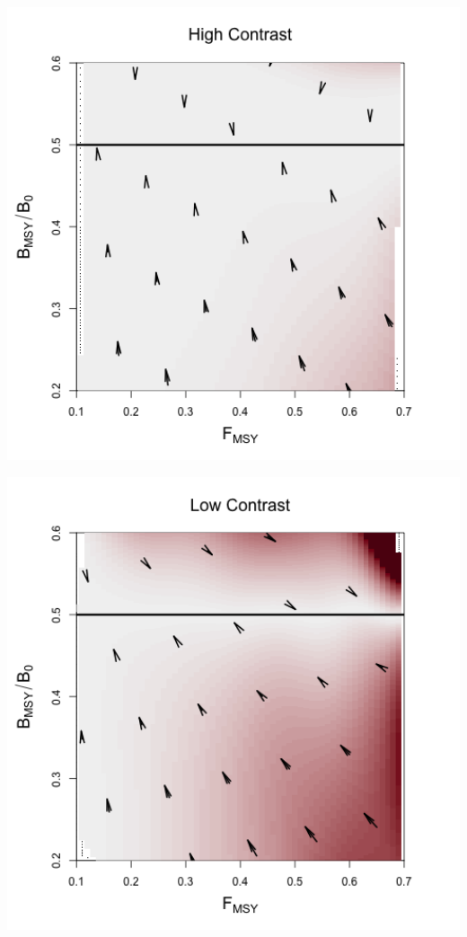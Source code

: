\documentclass[ xcolor = pdftex, dvipsnames, table ]{beamer}
\begin{document}
%
\begin{frame}
\begin{minipage}[h!]{0.44\textwidth}
\includegraphics[width=1.1\textwidth]{../../ptNew/directionalBiasSubPTExpT45MinCon.png}
\end{minipage}
\begin{minipage}[h!]{0.44\textwidth}
\includegraphics[width=1.1\textwidth]{../../ptNew/directionalBiasSubPTFlatT30.png}

\end{minipage}
\end{frame}
\end{document}
